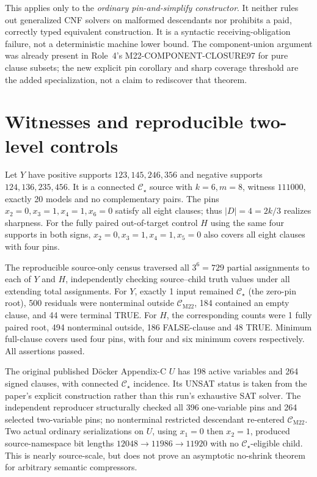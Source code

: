 \documentclass[11pt]{article}
\newcommand{\CM}{\mathcal C_{\mathrm{M22}}}
\newcommand{\Cs}{\mathcal C_\star}
\begin{document}
\noindent This applies only to the \emph{ordinary pin-and-simplify constructor}. It neither rules out generalized CNF solvers on malformed descendants nor prohibits a paid, correctly typed equivalent construction. It is a syntactic receiving-obligation failure, not a deterministic machine lower bound. The component-union argument was already present in Role~4's M22-COMPONENT-CLOSURE97 for pure clause subsets; the new explicit pin corollary and sharp coverage threshold are the added specialization, not a claim to rediscover that theorem.

\section{Witnesses and reproducible two-level controls}
Let \(Y\) have positive supports \(123,145,246,356\) and negative supports \(124,136,235,456\). It is a connected \(\Cs\) source with \(k=6,m=8\), witness \(111000\), exactly 20 models and no complementary pairs. The pins \(x_2=0,x_3=1,x_4=1,x_6=0\) satisfy all eight clauses; thus \(|D|=4=2k/3\) realizes sharpness. For the fully paired out-of-target control \(H\) using the same four supports in both signs, \(x_2=0,x_3=1,x_4=1,x_5=0\) also covers all eight clauses with four pins.

\noindent The reproducible source-only census traversed all \(3^6=729\) partial assignments to each of \(Y\) and \(H\), independently checking source--child truth values under all extending total assignments. For \(Y\), exactly 1 input remained \(\Cs\) (the zero-pin root), 500 residuals were nonterminal outside \(\CM\), 184 contained an empty clause, and 44 were terminal TRUE. For \(H\), the corresponding counts were 1 fully paired root, 494 nonterminal outside, 186 FALSE-clause and 48 TRUE. Minimum full-clause covers used four pins, with four and six minimum covers respectively. All assertions passed.

\noindent The original published D\"ocker Appendix-C \(U\) has 198 active variables and 264 signed clauses, with connected \(\Cs\) incidence. Its UNSAT status is taken from the paper's explicit construction rather than this run's exhaustive SAT solver. The independent reproducer structurally checked all 396 one-variable pins and 264 selected two-variable pins; no nonterminal restricted descendant re-entered \(\CM\). Two actual ordinary serializations on \(U\), using \(x_1=0\) then \(x_2=1\), produced source-namespace bit lengths \(12048\to11986\to11920\) with no \(\Cs\)-eligible child. This is nearly source-scale, but does not prove an asymptotic no-shrink theorem for arbitrary semantic compressors.
\end{document}
